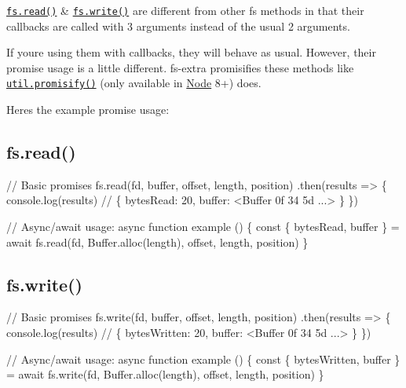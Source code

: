 \href{https://nodejs.org/api/fs.html#fs_fs_read_fd_buffer_offset_length_position_callback}{\tt {\ttfamily fs.\+read()}} \& \href{https://nodejs.org/api/fs.html#fs_fs_write_fd_buffer_offset_length_position_callback}{\tt {\ttfamily fs.\+write()}} are different from other {\ttfamily fs} methods in that their callbacks are called with 3 arguments instead of the usual 2 arguments.

If you\textquotesingle{}re using them with callbacks, they will behave as usual. However, their promise usage is a little different. {\ttfamily fs-\/extra} promisifies these methods like \href{https://nodejs.org/api/util.html#util_util_promisify_original}{\tt {\ttfamily util.\+promisify()}} (only available in \mbox{\hyperlink{classNode}{Node}} 8+) does.

Here\textquotesingle{}s the example promise usage\+:

\subsection*{{\ttfamily fs.\+read()}}


\begin{DoxyCode}
// Basic promises
fs.read(fd, buffer, offset, length, position)
  .then(results => \{
    console.log(results)
    // \{ bytesRead: 20, buffer: <Buffer 0f 34 5d ...> \}
  \})

// Async/await usage:
async function example () \{
  const \{ bytesRead, buffer \} = await fs.read(fd, Buffer.alloc(length), offset, length, position)
\}
\end{DoxyCode}


\subsection*{{\ttfamily fs.\+write()}}


\begin{DoxyCode}
// Basic promises
fs.write(fd, buffer, offset, length, position)
  .then(results => \{
    console.log(results)
    // \{ bytesWritten: 20, buffer: <Buffer 0f 34 5d ...> \}
  \})

// Async/await usage:
async function example () \{
  const \{ bytesWritten, buffer \} = await fs.write(fd, Buffer.alloc(length), offset, length, position)
\}
\end{DoxyCode}
 